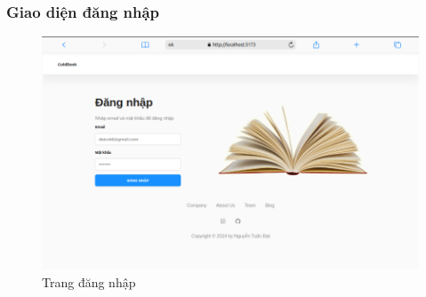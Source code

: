 \subsubsection{Giao diện đăng nhập}
\begin{figure}[H]
  \centering
  \includegraphics[width=1\textwidth]{report/images/admin/dangnhap.png}
  \caption{Trang đăng nhập}
\end{figure}
